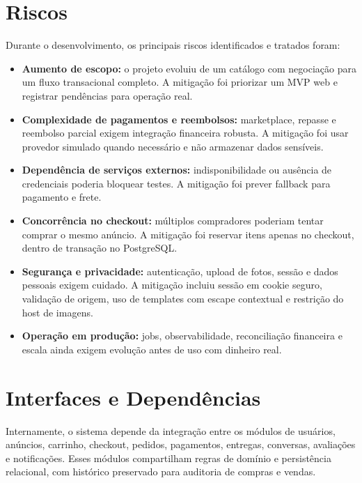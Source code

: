 ﻿\documentclass[12pt,a4paper]{article}
\begin{document}
\section{Riscos}
Durante o desenvolvimento, os principais riscos identificados e tratados foram:

\begin{itemize}
    \item \textbf{Aumento de escopo:} o projeto evoluiu de um catálogo com negociação para um fluxo transacional completo. A mitigação foi priorizar um MVP web e registrar pendências para operação real.

    \item \textbf{Complexidade de pagamentos e reembolsos:} marketplace, repasse e reembolso parcial exigem integração financeira robusta. A mitigação foi usar provedor simulado quando necessário e não armazenar dados sensíveis.

    \item \textbf{Dependência de serviços externos:} indisponibilidade ou ausência de credenciais poderia bloquear testes. A mitigação foi prever fallback para pagamento e frete.

    \item \textbf{Concorrência no checkout:} múltiplos compradores poderiam tentar comprar o mesmo anúncio. A mitigação foi reservar itens apenas no checkout, dentro de transação no PostgreSQL.

    \item \textbf{Segurança e privacidade:} autenticação, upload de fotos, sessão e dados pessoais exigem cuidado. A mitigação incluiu sessão em cookie seguro, validação de origem, uso de templates com escape contextual e restrição do host de imagens.

    \item \textbf{Operação em produção:} jobs, observabilidade, reconciliação financeira e escala ainda exigem evolução antes de uso com dinheiro real.

\end{itemize}

\section{Interfaces e Dependências}
Internamente, o sistema depende da integração entre os módulos de usuários, anúncios, carrinho, checkout, pedidos, pagamentos, entregas, conversas, avaliações e notificações. Esses módulos compartilham regras de domínio e persistência relacional, com histórico preservado para auditoria de compras e vendas.
\end{document}
